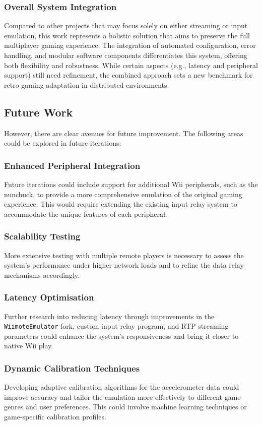 \subsubsection{Overall System Integration}
Compared to other projects that may focus solely on either streaming or input emulation, this work represents a holistic solution that aims to preserve the full multiplayer gaming experience. The integration of automated configuration, error handling, and modular software components differentiates this system, offering both flexibility and robustness. While certain aspects (e.g., latency and peripheral support) still need refinement, the combined approach sets a new benchmark for retro gaming adaptation in distributed environments.


\subsection*{Future Work}
However, there are clear avenues for future improvement. The following areas could be explored in future iterations:

\subsubsection{Enhanced Peripheral Integration}
Future iterations could include support for additional Wii peripherals, such as the nunchuck, to provide a more comprehensive emulation of the original gaming experience. This would require extending the existing input relay system to accommodate the unique features of each peripheral.

\subsubsection{Scalability Testing}
More extensive testing with multiple remote players is necessary to assess the system’s performance under higher network loads and to refine the data relay mechanisms accordingly.

\subsubsection{Latency Optimisation}
Further research into reducing latency through improvements in the \texttt{WiimoteEmulator} fork, custom input relay program, and RTP streaming parameters could enhance the system’s responsiveness and bring it closer to native Wii play.

\subsubsection{Dynamic Calibration Techniques}
Developing adaptive calibration algorithms for the accelerometer data could improve accuracy and tailor the emulation more effectively to different game genres and user preferences. This could involve machine learning techniques or game-specific calibration profiles.
